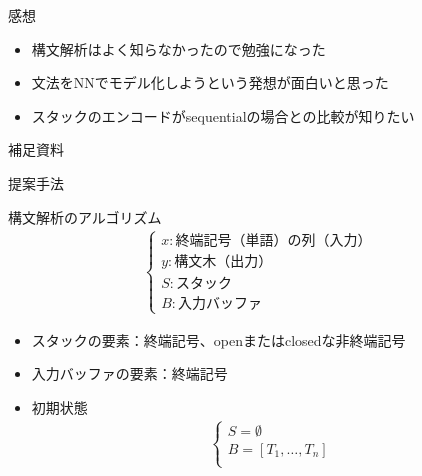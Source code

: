 \documentclass[aspectratio=43,unicode,10pt]{beamer}
\newcommand{\term}{終端記号}
\newcommand{\nt}{非終端記号}
\begin{document}
\begin{frame}{感想}
  \begin{itemize}
    \item 構文解析はよく知らなかったので勉強になった
    \item 文法をNNでモデル化しようという発想が面白いと思った
    \item スタックのエンコードがsequentialの場合との比較が知りたい
  \end{itemize}
\end{frame}

\begin{frame}
  \centering \Large 補足資料
\end{frame}

\begin{frame}{提案手法}
  \begin{block}{構文解析のアルゴリズム}
    \begin{gather*}
      \begin{cases}
        x: \text{\term （単語）の列（入力）} \\
        y: \text{構文木（出力）} \\
        S: \text{スタック} \\
        B: \text{入力バッファ}
      \end{cases}
    \end{gather*}
    \begin{itemize}
      \item スタックの要素：\term、openまたはclosedな\nt
      \item 入力バッファの要素：\term
      \item 初期状態
        \begin{gather*}
          \begin{cases}
            S = \emptyset \\
            B = [T_1, \ldots, T_n] \\
          \end{cases}
        \end{gather*}
    \end{itemize}
  \end{block}
\end{frame}
\end{document}
